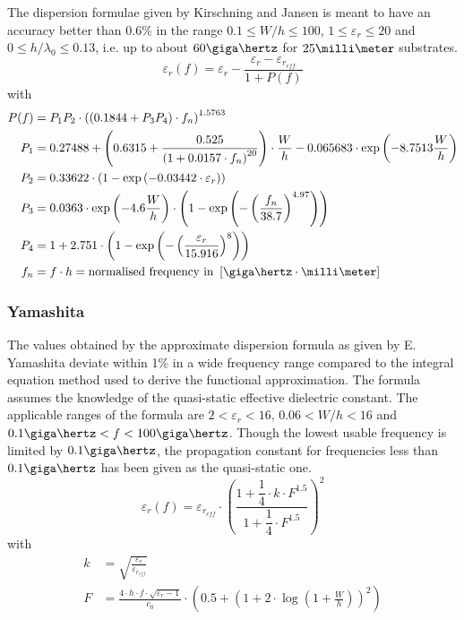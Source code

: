 \documentclass[10pt]{report}
\begin{document}
The dispersion formulae given by Kirschning and Jansen
\cite{Kirschning3} is meant to have an accuracy better than 0.6\% in
the range $0.1 \le W/h \le 100$, $1\le \varepsilon_r \le 20$ and $0
\le h/\lambda_0 \le 0.13$, i.e. up to about $60\giga\hertz$ for
$25\milli\meter$ substrates.
\begin{equation}
\varepsilon_{r}(f) = \varepsilon_{r} - \frac{\varepsilon_{r} - \varepsilon_{r_{eff}}}{1 + P(f)}
\end{equation}
with
\begin{align}
P(f) &= P_{1} P_{2} \cdot\left(\left(0.1844 + P_{3} P_{4}\right) \cdot f_{n}\right)^{1.5763}\\
P_{1} &= 0.27488 + \left(0.6315 + \frac{0.525}{\left(1 + 0.0157\cdot f_{n}\right)^{20}}\right)\cdot \frac{W}{h} - 0.065683 \cdot \exp\left(-8.7513\dfrac{W}{h}\right)\\
P_{2} &= 0.33622\cdot \left(1 - \exp\left(-0.03442 \cdot \varepsilon_{r}\right)\right)\\
P_{3} &= 0.0363 \cdot \exp\left(-4.6\dfrac{W}{h}\right) \cdot \left(1 - \exp\left(- \left(\dfrac{f_{n}}{38.7}\right)^{4.97}\right)\right)\\
P_{4} &= 1 + 2.751 \cdot \left(1 - \exp\left(- \left(\frac{\varepsilon_{r}}{15.916}\right)^{8}\right)\right)\\
f_{n} &= f \cdot h = \text{normalised frequency in } \left[\giga\hertz \cdot \milli\meter\right]
\end{align}

\subsubsection{Yamashita}

The values obtained by the approximate dispersion formula as given by
E. Yamashita \cite{Yamashita} deviate within 1\% in a wide frequency
range compared to the integral equation method used to derive the
functional approximation.  The formula assumes the knowledge of the
quasi-static effective dielectric constant.  The applicable ranges of
the formula are $2 < \varepsilon_r < 16$, $0.06 < W/h < 16$ and
$0.1\giga\hertz < f < 100\giga\hertz$.  Though the lowest usable
frequency is limited by $0.1\giga\hertz$, the propagation constant for
frequencies less than $0.1\giga\hertz$ has been given as the
quasi-static one.
\begin{equation}
\varepsilon_{r}(f) = \varepsilon_{r_{eff}}\cdot \left(\frac{1 + \dfrac{1}{4}\cdot k\cdot F^{1.5}}{1 + \dfrac{1}{4}\cdot F^{1.5}}\right)^{2}
\end{equation}
with
\begin{align}
k &= \sqrt{\frac{\varepsilon_{r}}{\varepsilon_{r_{eff}}}}\\
F &= \frac{4\cdot h\cdot f\cdot \sqrt{\varepsilon_{r} - 1}}{c_{0}} \cdot \left(0.5 + \left(1 + 2 \cdot \log\left(1 + \frac{W}{h}\right)\right)^{2}\right)
\end{align}
\end{document}
